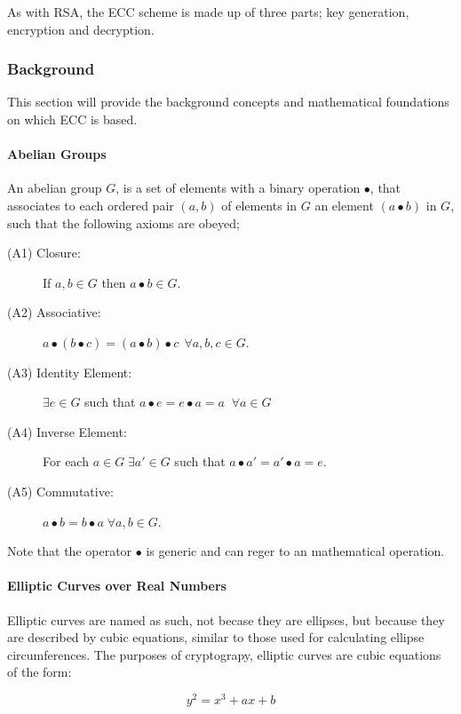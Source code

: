 \documentclass[a4paper,10pt]{report}
\begin{document}
As with RSA, the ECC scheme is made up of three parts; key generation, encryption and decryption.

\subsubsection{Background}

This section will provide the background concepts and mathematical foundations on which ECC is based.

\paragraph{Abelian Groups}

An abelian group $G$, is a set of elements with a binary operation $\bullet$, that associates to each ordered pair $(a,b)$ of elements in $G$ an element $(a \bullet b)$ in $G$, such that the following axioms are obeyed;

\begin{description}
 \item[(A1) Closure:] If $a , b \in G$ then $a \bullet b \in G$.
 \item[(A2) Associative:] $a \bullet (b \bullet c) = (a \bullet b) \bullet c \:\: \forall a,b,c \in G$.
 \item[(A3) Identity Element:] $\exists e \in G$ such that $a \bullet e = e \bullet a = a \;\; \forall a \in G$
 \item[(A4) Inverse Element:] For each $a \in G \; \exists a' \in G$ such that $a \bullet a' = a' \bullet a = e$.
 \item[(A5) Commutative:] $a \bullet b = b \bullet a \; \forall a,b \in G$. 
\end{description}

Note that the operator $\bullet$ is generic and can reger to an mathematical operation. 

\paragraph{Elliptic Curves over Real Numbers}

Elliptic curves are named as such, not becase they are ellipses, but because they are described by cubic equations, similar to those used for calculating ellipse circumferences. The purposes of cryptograpy, elliptic curves are cubic equations of the form:

\begin{equation}
y^2 = x^3 + ax + b 
\label{eq:mainecceq}
\end{equation}
\end{document}
